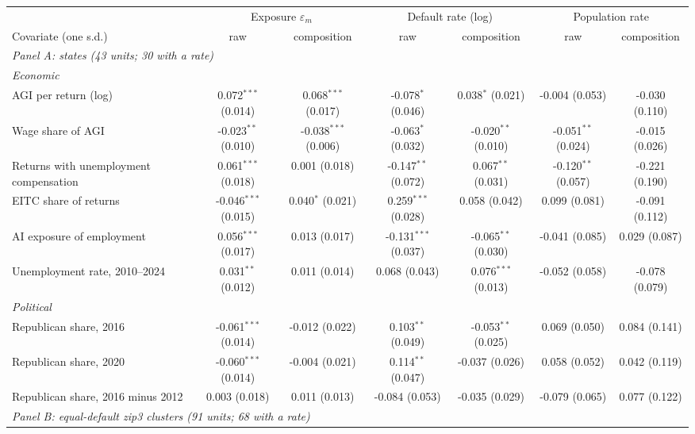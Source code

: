 \begin{tabular}{lcccccc}
\toprule
 & \multicolumn{2}{c}{Exposure $\varepsilon_m$} & \multicolumn{2}{c}{Default rate (log)} & \multicolumn{2}{c}{Population rate} \\
\cmidrule(lr){2-3}\cmidrule(lr){4-5}\cmidrule(lr){6-7}
Covariate (one s.d.) & raw & composition & raw & composition & raw & composition \\
\midrule
\multicolumn{7}{l}{\textit{Panel A: states (43 units; 30 with a rate)}} \\
\multicolumn{7}{l}{\quad \textit{Economic}} \\
\quad AGI per return (log) & 0.072$^{***}$ (0.014) & 0.068$^{***}$ (0.017) & -0.078$^{*}$ (0.046) & 0.038$^{*}$ (0.021) & -0.004 (0.053) & -0.030 (0.110) \\
\quad Wage share of AGI & -0.023$^{**}$ (0.010) & -0.038$^{***}$ (0.006) & -0.063$^{*}$ (0.032) & -0.020$^{**}$ (0.010) & -0.051$^{**}$ (0.024) & -0.015 (0.026) \\
\quad Returns with unemployment compensation & 0.061$^{***}$ (0.018) & 0.001 (0.018) & -0.147$^{**}$ (0.072) & 0.067$^{**}$ (0.031) & -0.120$^{**}$ (0.057) & -0.221 (0.190) \\
\quad EITC share of returns & -0.046$^{***}$ (0.015) & 0.040$^{*}$ (0.021) & 0.259$^{***}$ (0.028) & 0.058 (0.042) & 0.099 (0.081) & -0.091 (0.112) \\
\quad AI exposure of employment & 0.056$^{***}$ (0.017) & 0.013 (0.017) & -0.131$^{***}$ (0.037) & -0.065$^{**}$ (0.030) & -0.041 (0.085) & 0.029 (0.087) \\
\quad Unemployment rate, 2010--2024 & 0.031$^{**}$ (0.012) & 0.011 (0.014) & 0.068 (0.043) & 0.076$^{***}$ (0.013) & -0.052 (0.058) & -0.078 (0.079) \\
\multicolumn{7}{l}{\quad \textit{Political}} \\
\quad Republican share, 2016 & -0.061$^{***}$ (0.014) & -0.012 (0.022) & 0.103$^{**}$ (0.049) & -0.053$^{**}$ (0.025) & 0.069 (0.050) & 0.084 (0.141) \\
\quad Republican share, 2020 & -0.060$^{***}$ (0.014) & -0.004 (0.021) & 0.114$^{**}$ (0.047) & -0.037 (0.026) & 0.058 (0.052) & 0.042 (0.119) \\
\quad Republican share, 2016 minus 2012 & 0.003 (0.018) & 0.011 (0.013) & -0.084 (0.053) & -0.035 (0.029) & -0.079 (0.065) & 0.077 (0.122) \\
\midrule
\multicolumn{7}{l}{\textit{Panel B: equal-default zip3 clusters (91 units; 68 with a rate)}} \\

\end{tabular}
